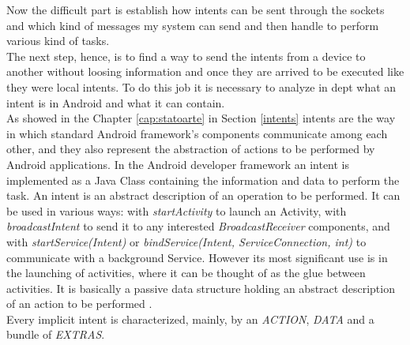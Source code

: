 Now the difficult part is establish how intents can be sent through the sockets and which kind of messages my system can send and then handle to perform various kind of tasks.\\
The next step, hence, is to find a way to send the intents from a device to another without loosing information and once they are arrived to be executed like they were local intents. To do this job it is necessary to analyze in dept what an intent is in Android and what it can contain.\\
As showed in the Chapter \ref{cap:statoarte} in Section \ref{intents} intents are the way in which standard Android framework's components communicate among each other, and they also represent the abstraction of actions to be performed by Android applications. In the Android developer framework an intent is implemented as a Java Class containing the information and data to perform the task. An intent is an abstract description of an operation to be performed. It can be used in various ways: with \textit{startActivity} to launch an Activity, with \textit{broadcastIntent} to send it to any interested \textit{BroadcastReceiver} components, and  with \textit{startService(Intent)} or \textit{bindService(Intent, ServiceConnection, int)} to communicate with a background Service. However its most significant use is in the launching of activities, where it can be thought of as the glue between activities. It is basically a passive data structure holding an abstract description of an action to be performed \cite{android2017intent}.\\
Every implicit intent is characterized, mainly, by an \textit{ACTION}, \textit{DATA} and a bundle of \textit{EXTRAS}.
